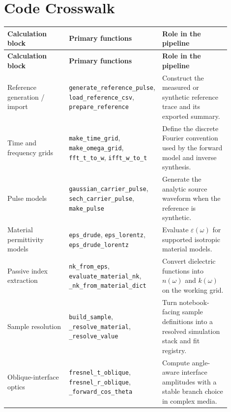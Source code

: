 \documentclass[11pt]{article}
\begin{document}
\section{Code Crosswalk}
\renewcommand{\arraystretch}{1.2}
\begin{longtable}{p{0.30\linewidth} p{0.25\linewidth} p{0.35\linewidth}}
\toprule
\textbf{Calculation block} & \textbf{Primary functions} & \textbf{Role in the pipeline} \\
\midrule
\endfirsthead
\toprule
\textbf{Calculation block} & \textbf{Primary functions} & \textbf{Role in the pipeline} \\
\midrule
\endhead
Reference generation / import &
\texttt{generate\_reference\_pulse}, \texttt{load\_reference\_csv}, \texttt{prepare\_reference} &
Construct the measured or synthetic reference trace and its exported summary. \\

Time and frequency grids &
\texttt{make\_time\_grid}, \texttt{make\_omega\_grid}, \texttt{fft\_t\_to\_w}, \texttt{ifft\_w\_to\_t} &
Define the discrete Fourier convention used by the forward model and inverse synthesis. \\

Pulse models &
\texttt{gaussian\_carrier\_pulse}, \texttt{sech\_carrier\_pulse}, \texttt{make\_pulse} &
Generate the analytic source waveform when the reference is synthetic. \\

Material permittivity models &
\texttt{eps\_drude}, \texttt{eps\_lorentz}, \texttt{eps\_drude\_lorentz} &
Evaluate $\varepsilon(\omega)$ for supported isotropic material models. \\

Passive index extraction &
\texttt{nk\_from\_eps}, \texttt{evaluate\_material\_nk}, \texttt{\_nk\_from\_material\_dict} &
Convert dielectric functions into $n(\omega)$ and $k(\omega)$ on the working grid. \\

Sample resolution &
\texttt{build\_sample}, \texttt{\_resolve\_material}, \texttt{\_resolve\_value} &
Turn notebook-facing sample definitions into a resolved simulation stack and fit registry. \\

Oblique-interface optics &
\texttt{fresnel\_t\_oblique}, \texttt{fresnel\_r\_oblique}, \texttt{\_forward\_cos\_theta} &
Compute angle-aware interface amplitudes with a stable branch choice in complex media. \\


\end{longtable}
\end{document}
